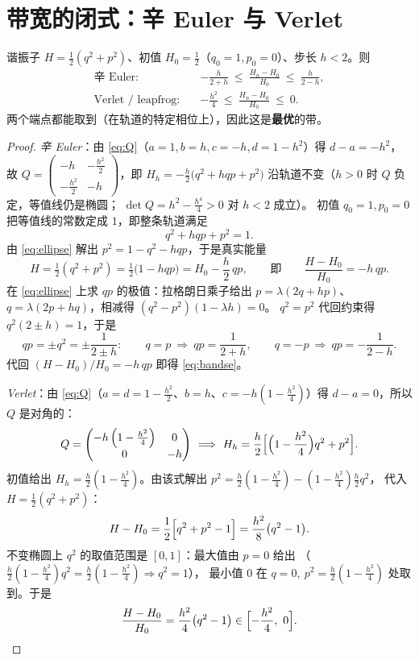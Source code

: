 \section{带宽的闭式：辛 Euler 与 Verlet}
\label{sec:band}

\begin{theorem}[谐振子上能量误差带的两个端点]
\label{thm:band}
谐振子 $H=\tfrac12(q^2+p^2)$、初值 $H_0=\tfrac12$（$q_0=1,p_0=0$）、步长 $h<2$。则
\begin{align}
  \text{辛 Euler:}\quad
  &-\frac{h}{2+h}\ \le\ \frac{H_n-H_0}{H_0}\ \le\ \frac{h}{2-h},
  \label{eq:bandse}\\[2pt]
  \text{Verlet / leapfrog:}\quad
  &-\frac{h^2}{4}\ \le\ \frac{H_n-H_0}{H_0}\ \le\ 0 .
  \label{eq:bandv}
\end{align}
两个端点都能取到（在轨道的特定相位上），因此这是\textbf{最优}的带。
\end{theorem}

\begin{proof}
\emph{辛 Euler}：由 \eqref{eq:Q}（$a=1,b=h,c=-h,d=1-h^2$）得
$d-a=-h^2$，故
$Q=\begin{pmatrix}-h&-\frac{h^2}{2}\\-\frac{h^2}{2}&-h\end{pmatrix}$，即
$H_h=-\frac h2\bigl(q^2+hqp+p^2\bigr)$ 沿轨道不变（$h>0$ 时 $Q$ 负定，等值线仍是椭圆；
$\det Q=h^2-\tfrac{h^4}{4}>0$ 对 $h<2$ 成立）。
初值 $q_0=1,p_0=0$ 把等值线的常数定成 $1$，即整条轨道满足
\begin{equation}
  q^2+hqp+p^2=1 .
  \label{eq:ellipse}
\end{equation}
由 \eqref{eq:ellipse} 解出 $p^2=1-q^2-hqp$，于是真实能量
\[
  H=\tfrac12(q^2+p^2)=\tfrac12\bigl(1-hqp\bigr)=H_0-\frac h2\,qp,
  \qquad\text{即}\qquad \frac{H-H_0}{H_0}=-h\,qp .
\]
在 \eqref{eq:ellipse} 上求 $qp$ 的极值：拉格朗日乘子给出
$p=\lambda(2q+hp)$、$q=\lambda(2p+hq)$，相减得 $(q^2-p^2)(1-\lambda h)=0$。
$q^2=p^2$ 代回约束得 $q^2(2\pm h)=1$，于是
\[
  qp=\pm q^2=\pm\frac{1}{2\pm h}:
  \qquad q=p\ \Rightarrow\ qp=\frac{1}{2+h},\qquad
  q=-p\ \Rightarrow\ qp=-\frac{1}{2-h}.
\]
代回 $(H-H_0)/H_0=-h\,qp$ 即得 \eqref{eq:bandse}。

\emph{Verlet}：由 \eqref{eq:Q}（$a=d=1-\tfrac{h^2}{2}$、$b=h$、$c=-h(1-\tfrac{h^2}{4})$）得
$d-a=0$，所以 $Q$ 是对角的：
\[
Q=\begin{pmatrix}-h\left(1-\frac{h^2}{4}\right)&0\\0&-h\end{pmatrix}
\ \Longrightarrow\
H_h=\frac h2\Bigl[\Bigl(1-\frac{h^2}{4}\Bigr)q^2+p^2\Bigr].
\]
初值给出 $H_h=\tfrac h2(1-\tfrac{h^2}{4})$。由该式解出 $p^2=\tfrac h2(1-\tfrac{h^2}{4})-(1-\tfrac{h^2}{4})\tfrac{h}{2}q^2$，
代入 $H=\tfrac12(q^2+p^2)$：
\[
H-H_0=\frac12\Bigl[q^2+p^2-1\Bigr]=\frac{h^2}{8}\bigl(q^2-1\bigr).
\]
不变椭圆上 $q^2$ 的取值范围是 $[0,1]$：最大值由 $p=0$ 给出
（$\tfrac h2(1-\tfrac{h^2}{4})q^2=\tfrac h2(1-\tfrac{h^2}{4})\Rightarrow q^2=1$），
最小值 $0$ 在 $q=0,\ p^2=\tfrac h2(1-\tfrac{h^2}{4})$ 处取到。于是
\[
  \frac{H-H_0}{H_0}=\frac{h^2}{4}\bigl(q^2-1\bigr)\in\Bigl[-\frac{h^2}{4},\ 0\Bigr].
\]
\end{proof}

